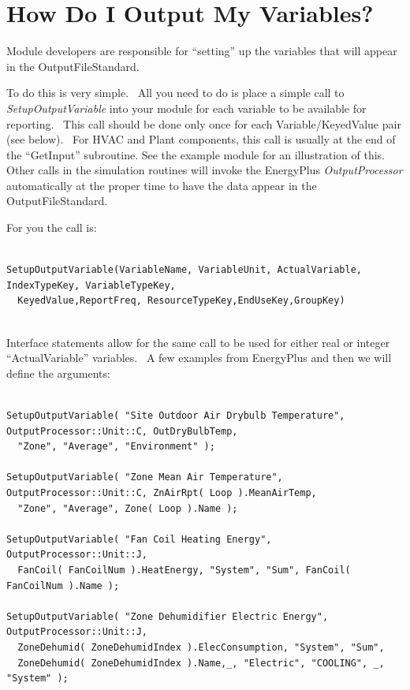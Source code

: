 \section{How Do I Output My Variables?}\label{how-do-i-output-my-variables}

Module developers are responsible for ``setting'' up the variables that will appear in the OutputFileStandard.

To do this is very simple.~ All you need to do is place a simple call to \emph{SetupOutputVariable} into your module for each variable to be available for reporting.~ This call should be done only once for each Variable/KeyedValue pair (see below).~ For HVAC and Plant components, this call is usually at the end of the ``GetInput'' subroutine. See the example module for an illustration of this. Other calls in the simulation routines will invoke the EnergyPlus \emph{OutputProcessor} automatically at the proper time to have the data appear in the OutputFileStandard.

For you the call is:

\begin{lstlisting}

SetupOutputVariable(VariableName, VariableUnit, ActualVariable, IndexTypeKey, VariableTypeKey,
  KeyedValue,ReportFreq, ResourceTypeKey,EndUseKey,GroupKey)


\end{lstlisting}


Interface statements allow for the same call to be used for either real or integer ``ActualVariable'' variables.~ A few examples from EnergyPlus and then we will define the arguments:

\begin{lstlisting}

SetupOutputVariable( "Site Outdoor Air Drybulb Temperature", OutputProcessor::Unit::C, OutDryBulbTemp,
  "Zone", "Average", "Environment" );

SetupOutputVariable( "Zone Mean Air Temperature", OutputProcessor::Unit::C, ZnAirRpt( Loop ).MeanAirTemp,
  "Zone", "Average", Zone( Loop ).Name );

SetupOutputVariable( "Fan Coil Heating Energy", OutputProcessor::Unit::J,
  FanCoil( FanCoilNum ).HeatEnergy, "System", "Sum", FanCoil( FanCoilNum ).Name );

SetupOutputVariable( "Zone Dehumidifier Electric Energy", OutputProcessor::Unit::J,
  ZoneDehumid( ZoneDehumidIndex ).ElecConsumption, "System", "Sum",
  ZoneDehumid( ZoneDehumidIndex ).Name,_, "Electric", "COOLING", _, "System" );

\end{lstlisting}


